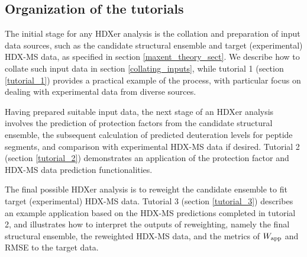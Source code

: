 \documentclass[9pt,tutorial]{livecoms}
\begin{document}
\subsection{Organization of the tutorials}
The initial stage for any HDXer analysis is the collation and preparation of input data sources, such as the candidate structural ensemble and target (experimental) HDX-MS data, as specified in section \ref{maxent_theory_sect}. 
We describe how to collate such input data in section \ref{collating_inputs}, while tutorial 1 (section \ref{tutorial_1}) provides a practical example of the process, with particular focus on dealing with experimental data from diverse sources.

Having prepared suitable input data, the next stage of an HDXer analysis involves the prediction of protection factors from the candidate structural ensemble, the subsequent calculation of predicted deuteration levels for peptide segments, and comparison with experimental HDX-MS data if desired.
Tutorial 2 (section \ref{tutorial_2}) demonstrates an application of the protection factor and HDX-MS data prediction functionalities.

The final possible HDXer analysis is to reweight the candidate ensemble to fit target (experimental) HDX-MS data.
Tutorial 3 (section \ref{tutorial_3}) describes an example application based on the HDX-MS predictions completed in tutorial 2, and illustrates how to interpret the outputs of reweighting, namely the final structural ensemble, the reweighted HDX-MS data, and the metrics of $W_\textnormal{app}$ and RMSE to the target data. 
\end{document}
